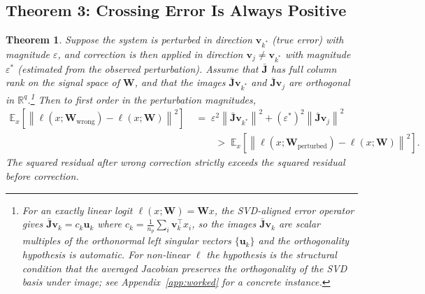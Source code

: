 \documentclass[11pt,a4paper]{article}
\newtheorem{theorem}{Theorem}[section]
\theoremstyle{definition}
\newcommand{\Wm}{\mathbf{W}}
\newcommand{\Jm}{\mathbf{J}}
\newcommand{\vk}[1][]{\mathbf{v}_{#1}}
\newcommand{\uk}[1][]{\mathbf{u}_{#1}}
\newcommand{\Rbb}{\mathbb{R}}
\newcommand{\Eop}{\mathbb{E}}
\newcommand{\norm}[1]{\left\lVert#1\right\rVert}
\begin{document}
\subsection{Theorem 3: Crossing Error Is Always Positive}
\label{sec:crossing}

\begin{thmbox}
\begin{theorem}
\label{thm:crossing}
Suppose the system is perturbed in direction $\vk[k^*]$ (true error) with magnitude $\varepsilon$, and correction is then applied in direction $\vk[j]\neq\vk[k^*]$ with magnitude $\varepsilon^*$ (estimated from the observed perturbation). Assume that $\bar{\Jm}$ has full column rank on the signal space of $\Wm$, and that the images $\bar{\Jm}\vk[k^*]$ and $\bar{\Jm}\vk[j]$ are orthogonal in $\Rbb^q$.\footnote{For an exactly linear logit $\ell(x;\Wm) = \Wm x$, the SVD-aligned error operator gives $\bar{\Jm}\vk[k] = c_k \uk[k]$ where $c_k = \tfrac{1}{n_p}\sum_i \vk[k]^\top x_i$, so the images $\bar{\Jm}\vk[k]$ are scalar multiples of the orthonormal left singular vectors $\{\uk[k]\}$ and the orthogonality hypothesis is automatic. For non-linear $\ell$ the hypothesis is the structural condition that the averaged Jacobian preserves the orthogonality of the SVD basis under image; see Appendix~\ref{app:worked} for a concrete instance.} Then to first order in the perturbation magnitudes,
\begin{equation}
\begin{split}
  \Eop_x\!\left[\norm{\ell(x;\Wm_{\mathrm{wrong}}) - \ell(x;\Wm)}^2\right]
  &\;=\; \varepsilon^2 \norm{\bar{\Jm}\vk[k^*]}^2
        + (\varepsilon^*)^2 \norm{\bar{\Jm}\vk[j]}^2 \\
  & \qquad\;>\; \Eop_x\!\left[\norm{\ell(x;\Wm_{\mathrm{perturbed}})
        - \ell(x;\Wm)}^2\right].
\end{split}
\label{eq:crossing}
\end{equation}
The squared residual after wrong correction strictly exceeds the squared residual before correction.
\end{theorem}
\end{thmbox}
\end{document}
